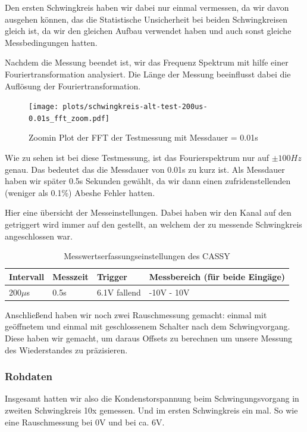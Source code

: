 \documentclass[twoside]{protokoll}
\begin{document}
Den ersten Schwingkreis haben wir dabei nur einmal vermessen, da wir davon ausgehen können, das die Statistische Unsicherheit bei beiden Schwingkreisen gleich ist, da wir den gleichen Aufbau verwendet haben und auch sonst gleiche Messbedingungen hatten.



Nachdem die Messung beendet ist, wir das Frequenz Spektrum mit hilfe einer Fouriertransformation analysiert.
Die Länge der Messung beeinflusst dabei die Auflösung der Fouriertransformation.
 
\begin{figure}[H]
    \centering
    \texttt{[image: plots/schwingkreis-alt-test-200us-0.01s\_fft\_zoom.pdf]}
    \caption{Zoomin Plot der FFT der Testmessung mit Messdauer = 0.01s}
\end{figure}
Wie zu sehen ist bei diese Testmessung, ist das Fourierspektrum nur auf $ \pm 100Hz $ genau. Das bedeutet das die Messdauer von 0.01s zu kurz ist.
Als Messdauer haben wir später 0.5s Sekunden gewählt, da wir dann einen zufridenstellenden (weniger als 0.1\%) Abeshe Fehler hatten.

Hier eine übersicht der Messeinstellungen. Dabei haben wir den Kanal auf den getriggert wird immer auf den gestellt, an welchem der zu messende Schwingkreis angeschlossen war.
\begin{table}[H]
    \centering
    \begin{tabularx}{1\textwidth}{X X X X} %
        \toprule
        \textbf{Intervall} & \textbf{Messzeit} & \textbf{Trigger} & \textbf{Messbereich (für beide Eingäge)} \\
        \midrule
        200$\mu$s  & 0.5s & 6.1V fallend & -10V - 10V \\
        \bottomrule
    \end{tabularx}
    \caption{Messwertserfassungseinstellungen des CASSY}
    \label{tab:mytable}
\end{table}
     
Anschließend haben wir noch zwei Rauschmessung gemacht: einmal mit geöffnetem und einmal mit geschlossenem Schalter nach dem Schwingvorgang.
Diese haben wir gemacht, um daraus Offsets zu berechnen um unsere Messung des Wiederstandes zu präzisieren.


\subsubsection{Rohdaten}

Insgesamt hatten wir also die Kondenstorspannung beim Schwingungsvorgang in zweiten Schwingkreis 10x gemessen. Und im ersten Schwingkreis ein mal. 
So wie eine Rauschmessung bei 0V und bei ca. 6V. 
\end{document}
